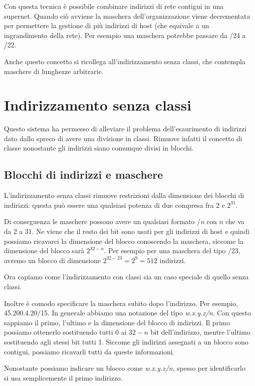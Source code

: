         Con questa tecnica è possibile combinare indirizzi di rete contigui in una supernet. Quando ciò avviene la maschera dell'organizzazione viene decrementata per permettere la gestione di più indirizzi di host (che equivale a un ingrandimento della rete). Per esempio una maschera potrebbe passare da /24 a /22.
        
        Anche questo concetto si ricollega all'indirizzamento senza classi, che contempla maschere di lunghezze arbitrarie.
        
\section{Indirizzamento senza classi}
    Questo sistema ha permesso di alleviare il problema dell'esaurimento di indirizzi dato dallo spreco di avere una divisione in classi. Rimuove infatti il concetto di classe nonostante gli indirizzi siano comunque divisi in blocchi.
    
    \subsection{Blocchi di indirizzi e maschere}
        L'indirizzamento senza classi rimuove restrizioni dalla dimensione dei blocchi di indirizzi: questa può essere una qualsiasi potenza di due compresa fra 2 e $2^{31}$.
        
        Di conseguenza le maschere possono avere un qualsiasi formato /\textit{n} con $n$ che va da 2 a 31. Ne viene che il resto dei bit sono usati per gli indirizzi di host e quindi possiamo ricavarci la dimensione del blocco conoscendo la maschera, siccome la dimensione del blocco sarà $2^{32-n}$. Per esempio per una maschera del tipo /23, avremo un blocco di dimensione $2^{32-23} = 2^9 = 512$ indirizzi.
        
        Ora capiamo come l'indirizzamento con classi sia un caso speciale di quello senza classi.
        
        Inoltre è comodo specificare la maschera subito dopo l'indirizzo. Per esempio, 45.200.4.20/15. In generale abbiamo una notazione del tipo \textit{w.x.y.z/n}. Con questo sappiamo il primo, l'ultimo e la dimensione del blocco di indirizzi. Il primo possiamo ottenerlo sostituendo tutti 0 ai $32-n$ bit dell'indirizzo, mentre l'ultimo sostituendo agli stessi bit tutti 1. Siccome gli indirizzi assegnati a un blocco sono contigui, possiamo ricavarli tutti da queste informazioni.
        
        Nonostante possiamo indicare un blocco come \textit{w.x.y.z/n}, spesso per identificarlo si usa semplicemente il primo indirizzo.
        
